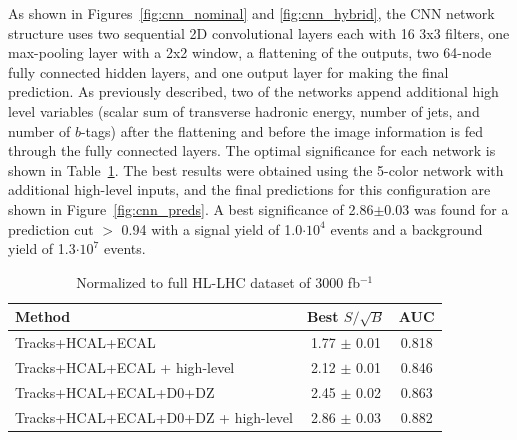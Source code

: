 
As shown in Figures~\ref{fig:cnn_nominal} and \ref{fig:cnn_hybrid}, the CNN network structure uses two sequential 2D convolutional layers each with 16 3x3 filters, one max-pooling layer with a 2x2 window, a flattening of the outputs, two 64-node fully connected hidden layers, and one output layer for making the final prediction. As previously described, two of the networks append additional high level variables (scalar sum of transverse hadronic energy, number of jets, and number of $b$-tags) after the flattening and before the image information is fed through the fully connected layers. The optimal significance for each network is shown in Table~\ref{tab:cnnResults}. The best results were obtained using the 5-color network with additional high-level inputs, and the final predictions for this configuration are shown in Figure~\ref{fig:cnn_preds}. A best significance of 2.86$\pm$0.03 was found for a prediction cut $>$ 0.94 with a signal yield of 1.0$\cdot 10^4$ events and a background yield of 1.3$\cdot 10^7$ events.

\begin{table}[h!]
\label{tab:cnnResults}
  \begin{center}
    \begin{tabular}{|l|c|c|} %
      \hline\hline
      \textbf{Method} & Best $S/\sqrt{B}$ & AUC \\
      \hline
      Tracks+HCAL+ECAL & 1.77 $\pm$ 0.01 & 0.818 \\
      Tracks+HCAL+ECAL + high-level & 2.12 $\pm$ 0.01 & 0.846 \\
      Tracks+HCAL+ECAL+D0+DZ & 2.45 $\pm$ 0.02 & 0.863 \\
      Tracks+HCAL+ECAL+D0+DZ + high-level & 2.86 $\pm$ 0.03 & 0.882 \\

      \hline\hline
    \end{tabular}
    \caption{Normalized to full HL-LHC dataset of 3000 fb$^{-1}$}
  \end{center}
\end{table}


